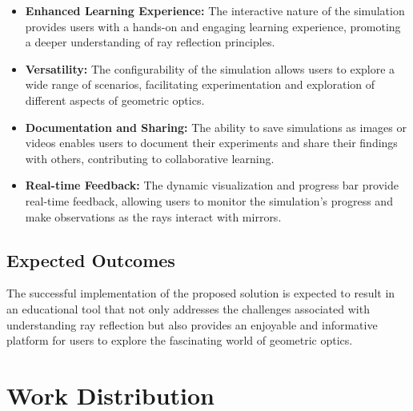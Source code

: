 \documentclass{article}
\begin{document}
\begin{itemize}
    \item \textbf{Enhanced Learning Experience:} The interactive nature of the simulation provides users with a hands-on and engaging learning experience, promoting a deeper understanding of ray reflection principles.
    
    \item \textbf{Versatility:} The configurability of the simulation allows users to explore a wide range of scenarios, facilitating experimentation and exploration of different aspects of geometric optics.
    
    \item \textbf{Documentation and Sharing:} The ability to save simulations as images or videos enables users to document their experiments and share their findings with others, contributing to collaborative learning.
    
    \item \textbf{Real-time Feedback:} The dynamic visualization and progress bar provide real-time feedback, allowing users to monitor the simulation's progress and make observations as the rays interact with mirrors.
\end{itemize}

\subsection{Expected Outcomes}
The successful implementation of the proposed solution is expected to result in
an educational tool that not only addresses the challenges associated with
understanding ray reflection but also provides an enjoyable and informative
platform for users to explore the fascinating world of geometric optics.

\section{Work Distribution}
\end{document}
